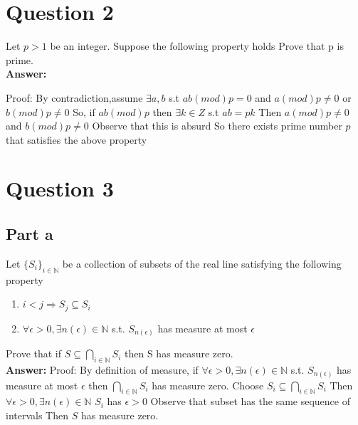 \documentclass[12pt]{article}
\begin{document}
\newpage
\section*{Question 2}

Let $p >1$ be an integer. Suppose the following property holds
Prove that p is prime.\\

{\noindent\bf Answer:}

{\noindent
Proof:\newline
By contradiction,assume $ \exists a,b$ s.t $ ab (mod) p=0 $ and $ a (mod) p \neq 0$ or $ b (mod)p \neq 0 $\newline
So, if $ ab(mod)p $ then $ \exists k \in Z$ s.t $ ab=pk $\newline
Then $a(mod)p \neq 0$ and $b(mod)p \neq 0$ \newline
Observe that this is absurd\newline
So there exists prime number $p$ that satisfies the above property

}
\newpage
\section*{Question 3}

\subsection*{Part a}

Let $\{S_{i}\}_{i\in\mathbb{N}}$ be a collection of subsets of the real line satisfying the following property
\begin{enumerate}
  \item $i<j\Rightarrow S_{j}\subseteq S_{i}$
  \item$\forall\epsilon>0,\exists n(\epsilon)\in\mathbb{N}$ s.t. $S_{n(\epsilon)}$ has measure at most $\epsilon$
\end{enumerate}
Prove that if $S\subseteq\bigcap_{i\in\mathbb{N}}S_{i}$ then S has measure zero.\\

{\noindent\bf Answer:}
{
 \newline
Proof:\newline
By definition of measure, if $\forall\epsilon>0,\exists n(\epsilon)\in\mathbb{N}$
s.t. $S_{n(\epsilon)}$ has measure at most $\epsilon$ then $\bigcap_{i\in\mathbb{N}}S_{i}$ has measure zero.\newline
Choose  $S_{i}\subseteq\bigcap_{i\in\mathbb{N}}S_{i}$\newline
Then $\forall\epsilon>0,\exists n(\epsilon)\in\mathbb{N}$
$S_{i}$ has $\epsilon>0$\newline
Observe that subset has the same sequence of intervals\newline
Then $S$ has measure zero.\newline
}
\end{document}
